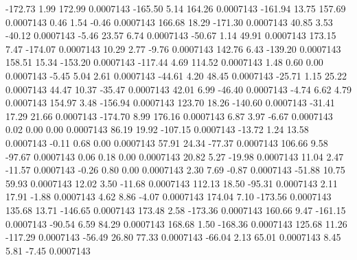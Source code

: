      -172.73        1.99      172.99     0.0007143
     -165.50        5.14      164.26     0.0007143
     -161.94       13.75      157.69     0.0007143
        0.46        1.54       -0.46     0.0007143
      166.68       18.29     -171.30     0.0007143
       40.85        3.53      -40.12     0.0007143
       -5.46       23.57        6.74     0.0007143
      -50.67        1.14       49.91     0.0007143
      173.15        7.47     -174.07     0.0007143
       10.29        2.77       -9.76     0.0007143
      142.76        6.43     -139.20     0.0007143
      158.51       15.34     -153.20     0.0007143
     -117.44        4.69      114.52     0.0007143
        1.48        0.60        0.00     0.0007143
       -5.45        5.04        2.61     0.0007143
      -44.61        4.20       48.45     0.0007143
      -25.71        1.15       25.22     0.0007143
       44.47       10.37      -35.47     0.0007143
       42.01        6.99      -46.40     0.0007143
       -4.74        6.62        4.79     0.0007143
      154.97        3.48     -156.94     0.0007143
      123.70       18.26     -140.60     0.0007143
      -31.41       17.29       21.66     0.0007143
     -174.70        8.99      176.16     0.0007143
        6.87        3.97       -6.67     0.0007143
        0.02        0.00        0.00     0.0007143
       86.19       19.92     -107.15     0.0007143
      -13.72        1.24       13.58     0.0007143
       -0.11        0.68        0.00     0.0007143
       57.91       24.34      -77.37     0.0007143
      106.66        9.58      -97.67     0.0007143
        0.06        0.18        0.00     0.0007143
       20.82        5.27      -19.98     0.0007143
       11.04        2.47      -11.57     0.0007143
       -0.26        0.80        0.00     0.0007143
        2.30        7.69       -0.87     0.0007143
      -51.88       10.75       59.93     0.0007143
       12.02        3.50      -11.68     0.0007143
      112.13       18.50      -95.31     0.0007143
        2.11       17.91       -1.88     0.0007143
        4.62        8.86       -4.07     0.0007143
      174.04        7.10     -173.56     0.0007143
      135.68       13.71     -146.65     0.0007143
      173.48        2.58     -173.36     0.0007143
      160.66        9.47     -161.15     0.0007143
      -90.54        6.59       84.29     0.0007143
      168.68        1.50     -168.36     0.0007143
      125.68       11.26     -117.29     0.0007143
      -56.49       26.80       77.33     0.0007143
      -66.04        2.13       65.01     0.0007143
        8.45        5.81       -7.45     0.0007143

